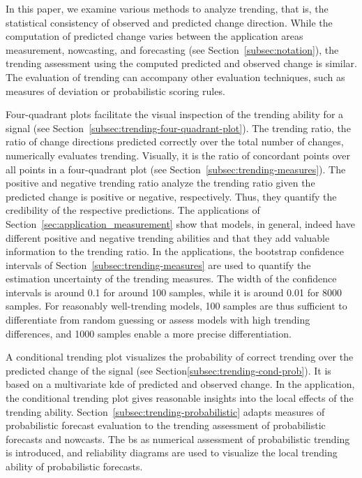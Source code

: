 
In this paper, we examine various methods to analyze trending, that is, the statistical consistency of observed and predicted change direction.
While the computation of predicted change varies between the application areas measurement, nowcasting, and forecasting (see Section~\ref{subsec:notation}), the trending assessment using the computed predicted and observed change is similar.
The evaluation of trending can accompany other evaluation techniques, such as measures of deviation or probabilistic scoring rules.

Four-quadrant plots facilitate the visual inspection of the trending ability for a signal (see Section~\ref{subsec:trending-four-quadrant-plot}).
The trending ratio, the ratio of change directions predicted correctly over the total number of changes, numerically evaluates trending.
Visually, it is the ratio of concordant points over all points in a four-quadrant plot (see Section~\ref{subsec:trending-measures}).
The positive and negative trending ratio analyze the trending ratio given the predicted change is positive or negative, respectively.
Thus, they quantify the credibility of the respective predictions. 
The applications of Section~\ref{sec:application_measurement} show that models, in general, indeed have different positive and negative trending abilities and that they add valuable information to the trending ratio.
In the applications, the bootstrap confidence intervals of Section~\ref{subsec:trending-measures} are used to quantify the estimation uncertainty of the trending measures.
The width of the confidence intervals is around 0.1 for around 100 samples, while it is around 0.01 for 8000 samples.
For reasonably well-trending models, 100 samples are thus sufficient to differentiate from random guessing or assess models with high trending differences, and 1000 samples enable a more precise differentiation.

A conditional trending plot visualizes the probability of correct trending over the predicted change of the signal (see Section\ref{subsec:trending-cond-prob}).
It is based on a multivariate \acf{kde} of predicted and observed change.
In the application, the conditional trending plot gives reasonable insights into the local effects of the trending ability.
Section~\ref{subsec:trending-probabilistic} adapts measures of probabilistic forecast evaluation to the trending assessment of probabilistic forecasts and nowcasts.
The \acf{bs} as numerical assessment of probabilistic trending is introduced, and reliability diagrams are used to visualize the local trending ability of probabilistic forecasts.

